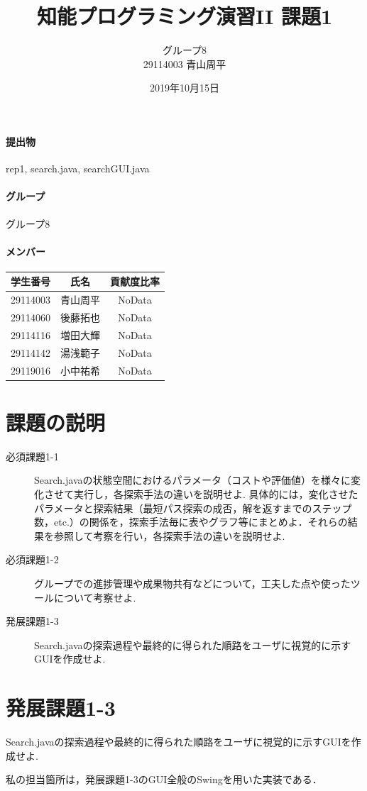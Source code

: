 \documentclass[12pt]{jarticle}
\title{知能プログラミング演習II 課題1}
\author{グループ8\\
  29114003 青山周平\\
}
\date{2019年10月15日}
\begin{document}
\maketitle

\paragraph{提出物} rep1, search.java, searchGUI.java
\paragraph{グループ} グループ8
\paragraph{メンバー}
\begin{tabular}{|c|c|c|}
  \hline
  学生番号&氏名&貢献度比率\\
  \hline\hline
  29114003&青山周平&NoData\\
  \hline
  29114060&後藤拓也&NoData\\
  \hline
  29114116&増田大輝&NoData\\
  \hline
  29114142&湯浅範子&NoData\\
  \hline
  29119016&小中祐希&NoData\\
  \hline
\end{tabular}



\section{課題の説明}
\begin{description}
\item[必須課題1-1]Search.javaの状態空間におけるパラメータ（コストや評価値）を様々に変化させて実行し，各探索手法の違いを説明せよ.
\hspace{4mm}具体的には，変化させたパラメータと探索結果（最短パス探索の成否，解を返すまでのステップ数，etc.）の関係を，探索手法毎に表やグラフ等にまとめよ．それらの結果を参照して考察を行い，各探索手法の違いを説明せよ. 
\item[必須課題1-2] グループでの進捗管理や成果物共有などについて，工夫した点や使ったツールについて考察せよ.
\item[発展課題1-3] Search.javaの探索過程や最終的に得られた順路をユーザに視覚的に示すGUIを作成せよ. 
\end{description}


\section{発展課題1-3}
\begin{screen}
Search.javaの探索過程や最終的に得られた順路をユーザに視覚的に示すGUIを作成せよ.
\end{screen}
私の担当箇所は，発展課題1-3のGUI全般のSwingを用いた実装である．
\end{document}
